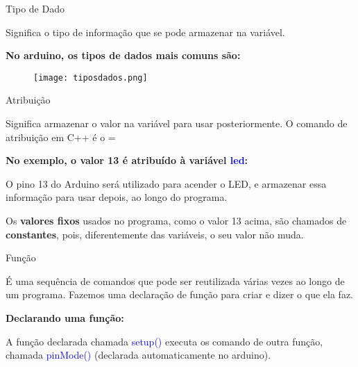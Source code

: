 \begin{frame}{Tipo de Dado}
	\begin{block}{}
		Significa o tipo de informação que se pode armazenar na variável.
	\end{block}
	
	\vspace{1em}
	\centering\textbf{No arduino, os tipos de dados mais comuns são:}
	\vspace{1em}
		
	\begin{figure}[H]
		\texttt{[image: tiposdados.png]}\footnotemark
	\end{figure}
	
\end{frame}

\begin{frame}{Atribuição}
	\begin{block}{}
		Significa armazenar o valor na variável para usar posteriormente. O comando de atribuição em C++ é o =		
	\end{block}
	
	\vspace{1em}
	\centering\textbf{No exemplo, o valor 13 é atribuído à variável \textcolor{blue}{led}:}
	\vspace{1em}
	
	
	
	\begin{block}{}
		O pino 13 do Arduino será utilizado para acender o LED, e armazenar essa informação para usar depois, ao longo do programa.
		
		Os \textbf{valores fixos} usados no programa, como o valor 13 acima, são chamados de \textbf{constantes}, pois, diferentemente das variáveis, o seu valor não muda.		
	\end{block}
\end{frame}

\begin{frame}{Função}
	\begin{block}{}
		É uma sequência de comandos que pode ser reutilizada várias vezes ao longo de um programa. 
		Fazemos uma declaração de função para criar e dizer o que ela faz.
	\end{block}
	
	\centering\textbf{Declarando uma função:}
	
	
	
	\begin{block}{}
		A função declarada chamada \textcolor{blue}{setup()\footnotemark} executa os comando de outra função, chamada \textcolor{blue}{pinMode()} (declarada automaticamente no arduino).
	\end{block}
	
\end{frame}

